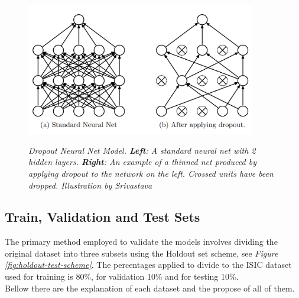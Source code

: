 \begin{itemize}
\begin{figure}[H]
\centering
\includegraphics[width=10cm]{imatges/preliminaries/dropout.png}
\caption[Dropout]{\textit{Dropout Neural Net Model. \textbf{Left}: A standard neural net with 2 hidden layers. \textbf{Right}:
An example of a thinned net produced by applying dropout to the network on the left.
Crossed units have been dropped. Illustration by Srivastava}}
{\label{fig:dropout}}
\end{figure}

\end{itemize}

\subsection{Train, Validation and Test Sets}

The primary method employed to validate the models involves dividing the original dataset into three subsets using the Holdout set scheme, see \textit{Figure \ref{fig:holdout-test-scheme}}. The percentages applied to divide to the ISIC dataset used for training is 80\%, for validation 10\% and for testing 10\%. \\

Bellow there are the explanation of each dataset and the propose of all of them.

